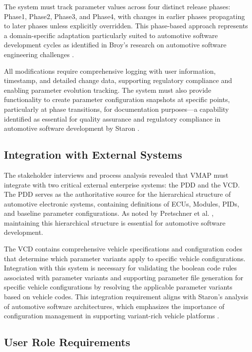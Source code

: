 The system must track parameter values across four distinct release phases: Phase1, Phase2, Phase3, and Phase4, with changes in earlier phases propagating to later phases unless explicitly overridden. This phase-based approach represents a domain-specific adaptation particularly suited to automotive software development cycles as identified in Broy's research on automotive software engineering challenges \cite{broy2006challenges}.

All modifications require comprehensive logging with user information, timestamp, and detailed change data, supporting regulatory compliance and enabling parameter evolution tracking. The system must also provide functionality to create parameter configuration snapshots at specific points, particularly at phase transitions, for documentation purposes—a capability identified as essential for quality assurance and regulatory compliance in automotive software development by Staron \cite{staron2021automotive}.

\subsection{Integration with External Systems}
\label{subsec:integration-external-systems}

The stakeholder interviews and process analysis revealed that \ac{VMAP} must integrate with two critical external enterprise systems: the \ac{PDD} and the \ac{VCD}. The \ac{PDD} serves as the authoritative source for the hierarchical structure of automotive electronic systems, containing definitions of \acp{ECU}, Modules, \acp{PID}, and baseline parameter configurations. As noted by Pretschner et al. \cite{pretschner2007software}, maintaining this hierarchical structure is essential for automotive software development.

The \ac{VCD} contains comprehensive vehicle specifications and configuration codes that determine which parameter variants apply to specific vehicle configurations. Integration with this system is necessary for validating the boolean code rules associated with parameter variants and supporting parameter file generation for specific vehicle configurations by resolving the applicable parameter variants based on vehicle codes. This integration requirement aligns with Staron's analysis of automotive software architectures, which emphasizes the importance of configuration management in supporting variant-rich vehicle platforms \cite{staron2021automotive}.

\subsection{User Role Requirements}
\label{subsec:user-role-requirements}

